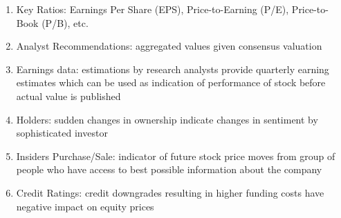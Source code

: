 \documentclass[a4paper,oneside,openany]{book}
\begin{document}
\begin{definition} 
\begin{enumerate}[label=\roman*.]
\setlength{\itemsep}{0pt}
\item Key Ratios: Earnings Per Share (EPS), Price-to-Earning (P/E), Price-to-Book (P/B), etc. 
\item Analyst Recommendations: aggregated values given consensus valuation
\item Earnings data: estimations by research analysts provide quarterly earning estimates which can be used as indication of performance of stock before actual value is published
\item Holders: sudden changes in ownership indicate changes in sentiment by sophisticated investor
\item Insiders Purchase/Sale: indicator of future stock price moves from group of people who have access to best possible information about the company
\item Credit Ratings: credit downgrades resulting in higher funding costs have negative impact on equity prices
\end{enumerate}
\end{definition}
\end{document}
